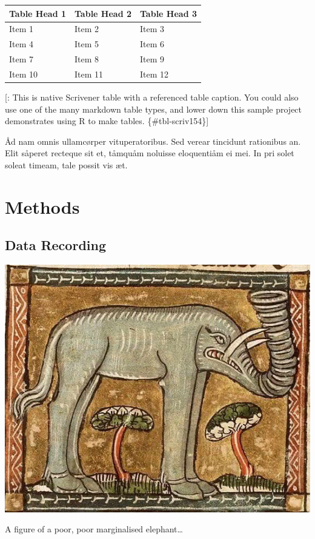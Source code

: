 \documentclass[
  12pt,
  a4paper,
  oneside,
  titlepage,
  toclink=all,
  toc=bibliography]{scrbook}
\theoremstyle{plain}
\theoremstyle{definition}
\theoremstyle{definition}
\theoremstyle{plain}
\theoremstyle{plain}
\theoremstyle{plain}
\theoremstyle{definition}
\theoremstyle{plain}
\theoremstyle{remark}
\begin{document}
\begin{longtable}[]{@{}lll@{}}
\toprule\noalign{}
Table Head 1 & Table Head 2 & Table Head 3 \\
\midrule\noalign{}
\endhead
\bottomrule\noalign{}
\endlastfoot
Item 1 & Item 2 & Item 3 \\
Item 4 & Item 5 & Item 6 \\
Item 7 & Item 8 & Item 9 \\
Item 10 & Item 11 & Item 12 \\
\end{longtable}

{[}: This is native Scrivener table with a referenced table caption. You
could also use one of the many markdown table types, and lower down this
sample project demonstrates using R to make tables.
\{\#tbl-scriv154\}{]}

Åd nam omnis ullamcørper vituperatoribus. Sed verear tincidunt
rationibus an. Elit såperet recteque sit et, tåmquåm noluisse
eloquentiåm ei mei. In pri solet soleat timeam, tale possit vis æt.

\hypertarget{sec-scriv155}{%
\chapter{Methods}\label{sec-scriv155}}

\hypertarget{sec-scriv156}{%
\section{Data Recording}\label{sec-scriv156}}

\protect\hypertarget{scriv156}{}{}

\begin{marginfigure}

{\centering \includegraphics{Elephant3.jpg}

}

\caption{\label{fig-scriv156}A figure of a poor, poor marginalised
elephant\ldots{}}

\end{marginfigure}
\end{document}
